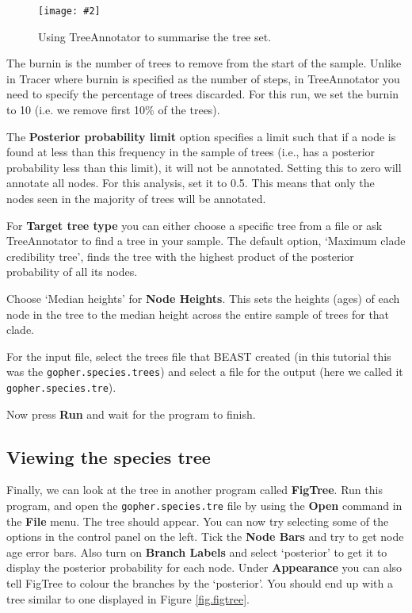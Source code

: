 \documentclass{article}
\newcommand{\includeimage}[2][]{%
\texttt{[image: \#2]}
}
\begin{document}
\begin{figure}[h]
\centering
\includeimage[width=0.8\textwidth]{figures/TreeAnnotator}
\caption{\label{fig.TreeAnnotator} Using TreeAnnotator to summarise the tree set.}
\end{figure}

The burnin is the number of trees to remove from the start of the sample. Unlike in Tracer where burnin is specified as the number of steps, in TreeAnnotator you need to specify the percentage of trees discarded. For this run, we set the burnin to 10 (i.e. we remove first 10\% of the trees).

The {\bf Posterior probability limit} option specifies a limit such that if a node is found at less than this frequency in the sample of trees (i.e., has a posterior probability less than this limit), it will not be annotated. Setting this to zero will annotate all nodes. For this analysis, set it to 0.5. This means that only the nodes seen in the majority of trees will be annotated. 

For {\bf Target tree type} you can either choose a specific tree from a file or ask TreeAnnotator to find a tree in your sample. The default option, `Maximum clade credibility tree', finds the tree with the highest product of the posterior probability of all its nodes.

Choose `Median heights' for {\bf Node Heights}. This sets the heights (ages) of each node in the tree to the median height across the entire sample of trees for that clade.

For the input file, select the trees file that BEAST created (in this tutorial this was the \texttt{gopher.species.trees}) and select a file for the output (here we called it \texttt{gopher.species.tre}).

Now press {\bf Run} and wait for the program to finish.

\subsection{Viewing the species tree}

Finally, we can look at the tree in another program called {\bf FigTree}. Run this program, and open
the \texttt{gopher.species.tre} file by using the {\bf Open} command in the {\bf File} menu. The tree should appear.
You can now try selecting some of the options in the control panel on the left. Tick the
{\bf Node Bars} and try to get node age error bars. Also turn on {\bf Branch Labels} and select `posterior' to get
it to display the posterior probability for each node. Under {\bf Appearance} you can also tell FigTree
to colour the branches by the `posterior'.
You should end up with a tree similar to one displayed in Figure \ref{fig.figtree}.
\end{document}
